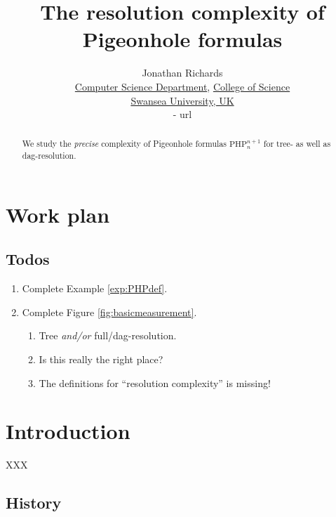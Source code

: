 \documentclass{report}
\newcommand{\php}{\mathrm{PHP}}
\begin{document}
\title{The resolution complexity of Pigeonhole formulas}

\author{
  Jonathan Richards\\
  \href{http://www.swan.ac.uk/compsci/}{Computer Science Department}, \href{http://www.swan.ac.uk/science/}{College of Science}\\
  \href{http://www.swan.ac.uk/}{Swansea University, UK}\\
  {- url}
}

\maketitle

\begin{abstract}
  We study the \emph{precise} complexity of Pigeonhole formulas $\php^{n+1}_n$ for tree- as well as dag-resolution.
\end{abstract}

\tableofcontents

\setcounter{chapter}{-1}
\chapter{Work plan}
\label{cha:workplan}

\section{Todos}
\label{sec:Todos}

\begin{enumerate}
\item Complete Example \ref{exp:PHPdef}.
\item Complete Figure \ref{fig:basicmeasurement}.
  \begin{enumerate}
  \item Tree \emph{and/or} full/dag-resolution.
  \item Is this really the right place?
  \item The definitions for ``resolution complexity'' is missing!
  \end{enumerate}
\end{enumerate}




\chapter{Introduction}
\label{cha:Introduction}

XXX

\section{History}
\label{sec:History}
\end{document}
